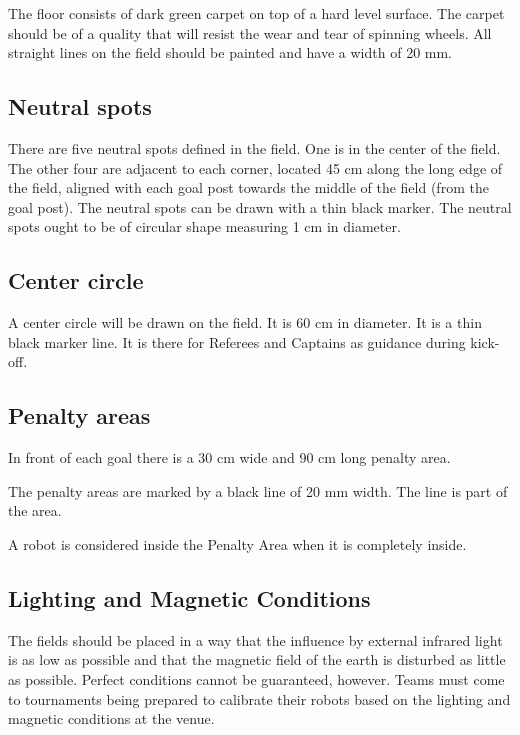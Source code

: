 \documentclass{article}
\begin{document}
The floor consists of dark green carpet on top of a hard level surface. The carpet should be of a quality that will resist the wear and tear of spinning wheels. All straight lines on the field should be painted and have a width of 20 mm.

\subsection{ Neutral spots \label{ref-034}}

There are five neutral spots defined in the field. One is in the center of the field. The other four are adjacent to each corner, located 45 cm along the long edge of the field, aligned with each goal post towards the middle of the field (from the goal post). The neutral spots can be drawn with a thin black marker. The neutral spots ought to be of circular shape measuring 1 cm in diameter.

\subsection{ Center circle \label{ref-035}}

A center circle will be drawn on the field. It is 60 cm in diameter. It is a thin black marker line. It is there for Referees and Captains as guidance during kick-off.

\subsection{ Penalty areas \label{ref-036}}

In front of each goal there is a 30 cm wide and 90 cm long penalty area.

The penalty areas are marked by a black line of 20 mm width. The line is part of the area.

A robot is considered inside the Penalty Area when it is completely inside.

\textbf{}

\subsection{ Lighting and Magnetic Conditions \label{ref-037}}

The fields should be placed in a way that the influence by external infrared light is as low as possible and that the magnetic field of the earth is disturbed as little as possible. Perfect conditions cannot be guaranteed, however. Teams must come to tournaments being prepared to calibrate their robots based on the lighting and magnetic conditions at the venue.
\end{document}
